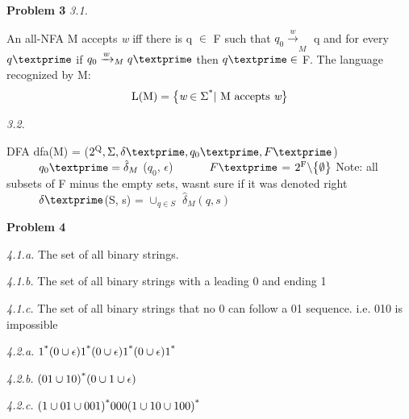 \documentclass[12pt]{report}
\begin{document}
\textbf{Problem 3}\newline
\textit{3.1.}
\begin{flushleft}
	An all-NFA M accepts \textit w iff there is q $\in$ F such that $q_0 \xrightarrow[]{w}_M$ q and for every $q\textprime$ if $q_0 \xrightarrow[]{w}_Mq\textprime$ then $q\textprime \in$ F. \newline\newline
	The language recognized by M:\newline
	\begin{equation*}
		\text{L(M)} = \big\{ \textit w \in \Sigma\textsuperscript{*} \vert \text{ M accepts } \textit w \big\}
	\end{equation*}
\end{flushleft}

\textit{3.2.}
\begin{flushleft}
	DFA dfa(M) = ($2\textsuperscript{Q}, \Sigma, \delta\textprime, q_0\textprime, F\textprime$)\newline
	$\tab q_0\textprime = \hat{\delta}_M$ ($q_0$, $\epsilon$)\newline
	$\tab F\textprime$ = $2\textsuperscript{F} \backslash \big\{\emptyset\big\}$ {\scriptsize Note: all subsets of F minus the empty sets, wasnt sure if it was denoted right}\newline
	$\tab \delta\textprime$(S, s) = $\cup_{q \in S}$ $\hat{\delta}_M(q, s)$
\end{flushleft}

\pagebreak
\textbf{Problem 4}\newline

\textit{4.1.a.}\newline
The set of all binary strings.\newline

\textit{4.1.b.}\newline
The set of all binary strings with a leading 0 and ending 1\newline

\textit{4.1.c.}\newline
The set of all binary strings that no 0 can follow a 01 sequence. i.e. 010 is impossible\newline

\textit{4.2.a.}\newline
$1\textsuperscript{*} (0 \cup \epsilon) 1\textsuperscript{*} (0 \cup \epsilon) 1\textsuperscript{*} (0 \cup \epsilon) 1\textsuperscript{*}$\newline

\textit{4.2.b.}\newline
$(01 \cup 10)\textsuperscript{*}(0 \cup 1 \cup \epsilon)$\newline

\textit{4.2.c.}\newline
$(1 \cup 01 \cup 001)\textsuperscript{*}000(1 \cup 10 \cup 100)\textsuperscript{*}$
\end{document}

